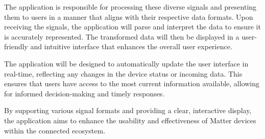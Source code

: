 \documentclass[conference]{IEEEtran}
\begin{document}
\begin{enumerate}[itemsep=2ex, parsep=1ex]
	      The application is responsible for processing these diverse signals and presenting
	      them to users in a manner that aligns with their respective data formats.
	      Upon receiving the signals, the application will parse and interpret the data
	      to ensure it is accurately represented. The transformed data will then be
	      displayed in a user-friendly and intuitive interface that enhances the
	      overall user experience.
	      	      	      
	      The application will be designed to automatically update the user
	      interface in real-time, reflecting any changes in the device status or incoming
	      data. This ensures that users have access to the most current information
	      available, allowing for informed decision-making and timely responses.
	      	      	      
	      By supporting various signal formats and providing a clear, interactive
	      display, the application aims to enhance the usability and effectiveness of
	      Matter devices within the connected ecosystem.
\end{enumerate}
\end{document}
